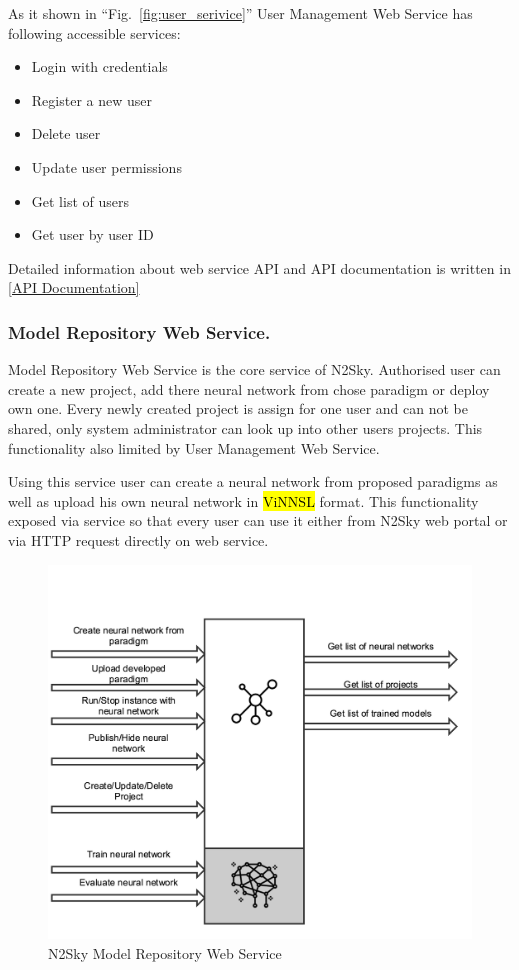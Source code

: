 As it shown in ``Fig.~\ref{fig:user_serivice}'' User Management Web Service has following accessible services:

\begin{itemize}
\item Login with credentials
\item Register a new user 
\item Delete user
\item Update user permissions
\item Get list of users
\item Get user by user ID
\end{itemize}
 
 Detailed information about web service API and API documentation is written in \autoref{API Documentation}

\subsubsection{Model Repository Web Service.}\label{Model Repository Web Service}  Model Repository Web Service is the core service of N2Sky. Authorised user can create a new project, add there neural network from chose paradigm or deploy own one. Every newly created project is assign for one user and can not be shared, only system administrator can look up into other users projects. This functionality also limited by User Management Web Service. 

Using this service user can create a neural network from proposed paradigms as well as upload his own neural network in \hl{ViNNSL} format. This functionality exposed via service so that every user can use it either from N2Sky web portal or via HTTP request directly on web service.

\begin{figure}[htbp]
\begin{center}
  \includegraphics[width=\linewidth]{components/3/components/model_serivce.png}
  \caption{N2Sky Model Repository Web Service}
  \label{fig:model_serivce}
\end{center}
\end{figure}

